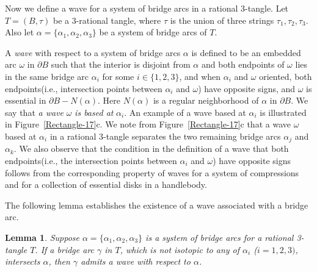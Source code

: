 \documentclass[12pt]{amsart}
\newtheorem{Lem}[theorem]{Lemma}
\newcommand{\al}{\alpha}
\begin{document}
Now we define a wave for a system of bridge arcs in a rational 3-tangle.
Let $T=(B, \tau)$ be a $3$-rational tangle, where $\tau$ is the union of three strings $\tau_1, \tau_2, \tau_3$.
Also let $\alpha=\{\alpha_1,\alpha_2, \alpha_3\}$ be a system of bridge arcs of $T$.

A \textit{wave} with respect to a system of bridge
arcs $\al$ is defined to be an embedded arc $\omega$ in $\partial B$ such that the interior is disjoint from $\al$ and both endpoints
of $\omega$ lies in the same bridge arc $\al_i$ for some $i\in\{1, 2, 3\}$, and when
$\al_i$ and $\omega$ oriented, both endpoints(i.e., intersection points between $\al_i$ and $\omega$)
have opposite signs, and $\omega$ is essential in $\partial B -N(\al)$.
Here $N(\al)$ is a regular neighborhood of $\al$ in $\partial B$. We say that \textit{a wave} $\omega$ \textit{is based at} $\al_i$.
An example of a wave based at $\alpha_i$ is illustrated in Figure~\ref{Rectangle-17}c.
We note from Figure~\ref{Rectangle-17}c that a wave $\omega$ based at $\al_i$ in a rational 3-tangle separates the two remaining bridge arcs
$\al_j$ and $\al_k$. We also observe that the condition in the definition of a wave that both endpoints(i.e., the intersection points between $\al_i$ and $\omega$)
have opposite signs follows from the corresponding property of waves for a system of compressions and for a collection
of essential disks in a handlebody.


The following lemma establishes the existence of a wave associated with a bridge arc.

\begin{Lem}\label{wave existence}
Suppose  $\alpha=\{\alpha_1,\alpha_2, \alpha_3\}$ is a system of bridge arcs for a rational 3-tangle $T$. If a bridge arc $\gamma$ in $T$, which
is not isotopic to any of $\alpha_i$ ($i=1, 2, 3)$, intersects $\al$, then $\gamma$ admits a wave with respect to $\alpha$.
\end{Lem}
\end{document}
